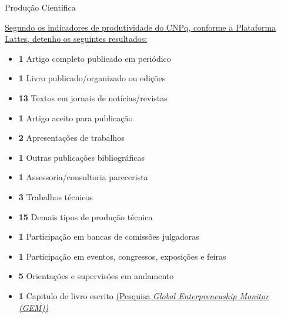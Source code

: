 \documentclass{beamer}
\begin{document}
\begin{frame}{Produção Científica}

\footnotesize
\textcolor{blue}{\href{http://lattes.cnpq.br/3532649625879285}{Segundo os indicadores de produtividade do CNPq, conforme a Plataforma Lattes, detenho os seguintes resultados:}}
\begin{itemize}
    \item \textbf{1} Artigo completo publicado em periódico
    \item \textbf{1} Livro publicado/organizado ou edições
    \item \textbf{13} Textos em jornais de notícias/revistas
    \item \textbf{1} Artigo aceito para publicação
    \item \textbf{2} Apresentações de trabalhos
    \item \textbf{1} Outras publicações bibliográficas
    \item \textbf{1} Assessoria/consultoria parecerista
    \item \textbf{3} Trabalhos técnicos
    \item \textbf{15} Demais tipos de produção técnica
    \item \textbf{1} Participação em bancas de comissões julgadoras 
    \item \textbf{1} Participação em eventos, congressos, exposições e feiras
    \item \textbf{5} Orientações e supervisões em andamento
    \item \textbf{1} Capitulo de livro escrito \textcolor{blue}{\href{http://ibqp.org.br/wp-content/uploads/2016/10/Empreendedorismo-no-Brasil-2011-Relat\%C3\%83\%C2\%B3rio.pdf}{(Pesquisa \textit{Global Enterpreneuship Monitor (GEM))}}}
\end{itemize}
    
\end{frame}
\end{document}
